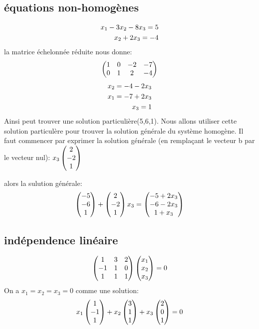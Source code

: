 \documentclass[a4paper,10pt]{article}
\begin{document}
\subsection{équations non-homogènes}

\begin{eqnarray}
x_1-3x_2-8x_3=5\cr
x_2+2x_3=-4\cr
\end{eqnarray}
la matrice échelonnée réduite nous donne:
\[
\begin{pmatrix}
 1&0&-2&-7\cr
 0&1&2&-4\cr
\end{pmatrix}
\]
\newline
\begin{eqnarray}
 x_2=-4-2x_3\cr
 x_1=-7+2x_3\cr
 x_3=1
\end{eqnarray}
Ainsi peut trouver une solution particulière(5,6,1). Nous allons utiliser cette solution particulère pour trouver la solution générale du système homogène.
\newline
Il faut commencer par exprimer la solution générale (en remplaçant le vecteur b par le vecteur nul):
\newline
$
x_3
\begin{pmatrix}
2\cr
-2\cr
1\cr
\end{pmatrix}
$



alors la sulution générale:
\[
\begin{pmatrix}
-5\cr
-6\cr
1\cr
\end{pmatrix}
+
\begin{pmatrix}
2\cr
-2\cr
1\cr
\end{pmatrix}
x_3=
\begin{pmatrix}
-5 +2x_3\cr
-6-2x_3\cr
1+x_3\cr
\end{pmatrix}
\]
\subsection{indépendence linéaire}
\[
\begin{pmatrix}
1&3&2\cr
-1&1&0\cr
1&1&1\cr
\end{pmatrix}
\begin{pmatrix}
x_1\cr
x_2\cr
x_3\cr
\end{pmatrix}
=0
\]
\newline
On a $x_1=x_2=x_3=0$
comme une solution:
\[
x_1
\begin{pmatrix}
1\cr
-1\cr
1\cr
\end{pmatrix}
+x_2
\begin{pmatrix}
3\cr
1\cr
1\cr
\end{pmatrix}
+x_3
\begin{pmatrix}
2\cr
0\cr
1\cr
\end{pmatrix}
=0
\]
\newline
\end{document}
